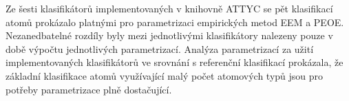 \newpage
\vspace*{0.3cm}
\noindent Ze šesti klasifikátorů implementovaných v knihovně ATTYC se pět klasifikací atomů prokázalo platnými pro parametrizaci empirických metod EEM a PEOE. Nezanedbatelné rozdíly byly mezi jednotlivými klasifikátory nalezeny pouze v době výpočtu jednotlivých parametrizací. Analýza parametrizací za užití implementovaných klasifikátorů ve srovnání s referenční klasifikací prokázala, že základní klasifikace atomů využívající malý počet atomových typů jsou pro potřeby parametrizace plně dostačující.

